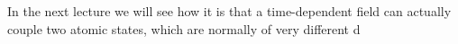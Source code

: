 In the next lecture we will see how it is that a time-dependent field can actually couple two atomic states, which are normally of very different  d